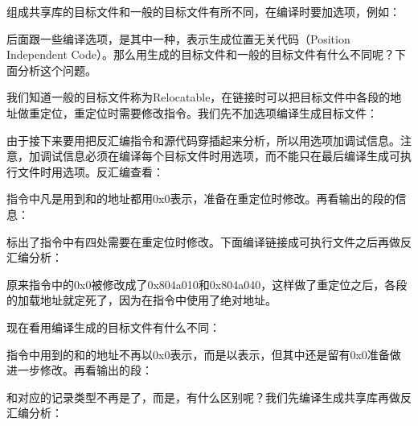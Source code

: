 组成共享库的目标文件和一般的目标文件有所不同，在编译时要加选项，例如：




后面跟一些编译选项，是其中一种，表示生成位置无关代码（Position Independent Code）。那么用生成的目标文件和一般的目标文件有什么不同呢？下面分析这个问题。



我们知道一般的目标文件称为Relocatable，在链接时可以把目标文件中各段的地址做重定位，重定位时需要修改指令。我们先不加选项编译生成目标文件：




由于接下来要用把反汇编指令和源代码穿插起来分析，所以用选项加调试信息。注意，加调试信息必须在编译每个目标文件时用选项，而不能只在最后编译生成可执行文件时用选项。反汇编查看：




指令中凡是用到和的地址都用0x0表示，准备在重定位时修改。再看输出的段的信息：




标出了指令中有四处需要在重定位时修改。下面编译链接成可执行文件之后再做反汇编分析：




原来指令中的0x0被修改成了0x804a010和0x804a040，这样做了重定位之后，各段的加载地址就定死了，因为在指令中使用了绝对地址。



现在看用编译生成的目标文件有什么不同：




指令中用到的和的地址不再以0x0表示，而是以表示，但其中还是留有0x0准备做进一步修改。再看输出的段：




和对应的记录类型不再是了，而是，有什么区别呢？我们先编译生成共享库再做反汇编分析：


